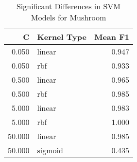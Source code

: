 \begin{table}
\centering
\caption{Significant Differences in SVM Models for Mushroom}
\label{tab:svm_significant_pairs_mushroom}
\begin{tabular}{rlr}
\toprule
C & Kernel Type & Mean F1 \\
\midrule
0.050 & linear & 0.947 \\
0.050 & rbf & 0.933 \\
0.500 & linear & 0.965 \\
0.500 & rbf & 0.985 \\
5.000 & linear & 0.983 \\
5.000 & rbf & 1.000 \\
50.000 & linear & 0.985 \\
50.000 & sigmoid & 0.435 \\
\bottomrule
\end{tabular}
\end{table}
